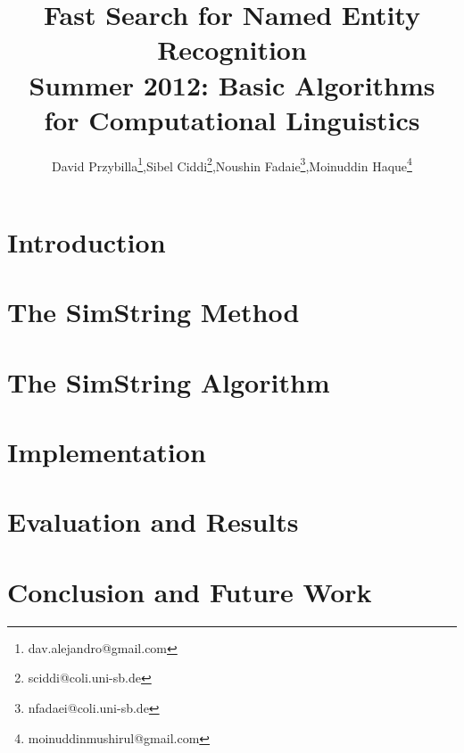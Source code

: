 \documentclass[4pt,a4paper]{article}
\begin{document}
\author{David Przybilla\footnote{dav.alejandro@gmail.com},\hspace{3 mm}Sibel Ciddi\footnote{sciddi@coli.uni-sb.de},\hspace{3 mm}Noushin Fadaie\footnote{nfadaei@coli.uni-sb.de},\hspace{3 mm}Moinuddin Haque\footnote{moinuddinmushirul@gmail.com}}
\title{Fast Search for Named Entity Recognition\\ \large Summer 2012: Basic Algorithms for Computational Linguistics}
\maketitle



\section{Introduction}
\label{sec:intro}


\section{The SimString Method}
\label{sec:simString}


\section{The SimString Algorithm}
\label{sec:algorithm}


\section{Implementation}
\label{sec:implementation}


\section{Evaluation and Results}
\label{sec:results}


\section{Conclusion and Future Work}
\label{sec:conclusion}



\end{document}
